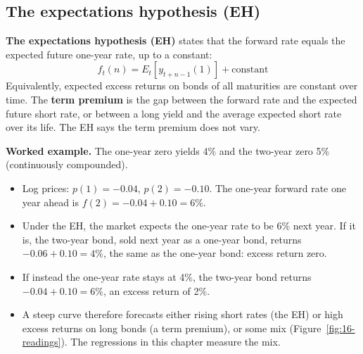 \subsection{The expectations hypothesis (EH)}

\textbf{The expectations hypothesis (EH)} states that the forward rate equals the expected future one-year rate, up to a constant:
\begin{equation}
  f_t(n) = E_t\!\left[y_{t+n-1}(1)\right] + \text{constant}
  \label{eq:16-eh}
\end{equation}
Equivalently, expected excess returns on bonds of all maturities are constant over time. The \textbf{term premium} is the gap between the forward rate and the expected future short rate, or between a long yield and the average expected short rate over its life. The EH says the term premium does not vary.

\textbf{Worked example.} The one-year zero yields 4\% and the two-year zero 5\% (continuously compounded).

\begin{itemize}
  \item Log prices: $p(1) = -0.04$, $p(2) = -0.10$. The one-year forward rate one year ahead is $f(2) = -0.04 + 0.10 = 6\%$.
  \item Under the EH, the market expects the one-year rate to be 6\% next year. If it is, the two-year bond, sold next year as a one-year bond, returns $-0.06 + 0.10 = 4\%$, the same as the one-year bond: excess return zero.
  \item If instead the one-year rate stays at 4\%, the two-year bond returns $-0.04 + 0.10 = 6\%$, an excess return of 2\%.
  \item A steep curve therefore forecasts either rising short rates (the EH) or high excess returns on long bonds (a term premium), or some mix (Figure~\ref{fig:16-readings}). The regressions in this chapter measure the mix.
\end{itemize}

